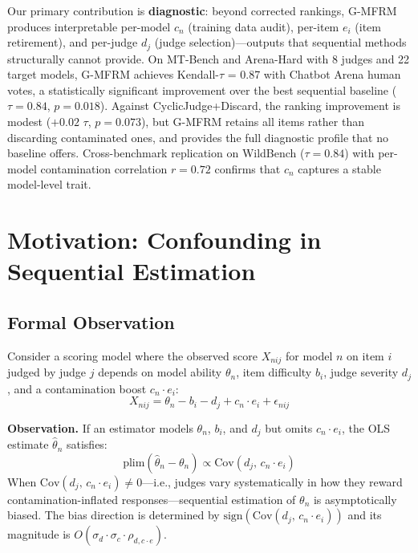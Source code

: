 \documentclass[11pt]{article}
\newcommand{\gmfrm}{G-MFRM}
\newcommand{\cn}{c_n}
\newcommand{\ei}{e_i}
\newcommand{\severity}{d_j}
\begin{document}
Our primary contribution is \textbf{diagnostic}: beyond corrected rankings, \gmfrm{} produces interpretable per-model $\cn$ (training data audit), per-item $\ei$ (item retirement), and per-judge $\severity$ (judge selection)---outputs that sequential methods structurally cannot provide.
On MT-Bench and Arena-Hard with 8 judges and 22 target models, \gmfrm{} achieves Kendall-$\tau$ = 0.87 with Chatbot Arena human votes, a statistically significant improvement over the best sequential baseline ($\tau = 0.84$, $p = 0.018$).
Against CyclicJudge+Discard, the ranking improvement is modest ($+0.02$ $\tau$, $p = 0.073$), but \gmfrm{} retains all items rather than discarding contaminated ones, and provides the full diagnostic profile that no baseline offers.
Cross-benchmark replication on WildBench ($\tau = 0.84$) with per-model contamination correlation $r = 0.72$ confirms that $\cn$ captures a stable model-level trait.

\section{Motivation: Confounding in Sequential Estimation}
\label{sec:motivation}

\subsection{Formal Observation}

Consider a scoring model where the observed score $X_{nij}$ for model $n$ on item $i$ judged by judge $j$ depends on model ability $\theta_n$, item difficulty $b_i$, judge severity $\severity$, and a contamination boost $\cn \cdot \ei$:
\begin{equation}
    X_{nij} = \theta_n - b_i - \severity + \cn \cdot \ei + \epsilon_{nij}
\end{equation}

\noindent\textbf{Observation.}
If an estimator models $\theta_n$, $b_i$, and $\severity$ but omits $\cn \cdot \ei$, the OLS estimate $\hat{\theta}_n$ satisfies:
\begin{equation}
    \text{plim}(\hat{\theta}_n - \theta_n) \propto \text{Cov}(\severity,\, \cn \cdot \ei)
\end{equation}
When $\text{Cov}(\severity,\, \cn \cdot \ei) \neq 0$---i.e., judges vary systematically in how they reward contamination-inflated responses---sequential estimation of $\theta_n$ is asymptotically biased.
The bias direction is determined by $\text{sign}(\text{Cov}(\severity,\, \cn \cdot \ei))$ and its magnitude is $O(\sigma_d \cdot \sigma_c \cdot \rho_{d,c \cdot e})$.
\end{document}
